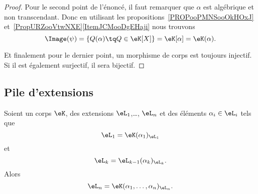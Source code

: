 \begin{proof}
    Pour le second point de l'énoncé, il faut remarquer que \( \alpha\) est algébrique et non transcendant. Donc en utilisant les propositions~\ref{PROPooPMNSooOkHOxJ} et~\ref{PropURZooVtwNXE}\ref{ItemJCMooDgEHaji} nous trouvons
    \begin{equation}
        \Image(\psi)=\{ Q(\alpha)\tq Q\in \eK[X] \}=\eK[\alpha]=\eK(\alpha).
    \end{equation}

    Et finalement pour le dernier point, un morphisme de corps est toujours injectif. Si il est également surjectif, il sera bijectif.
\end{proof}

\subsection{Pile d'extensions}

\begin{lemma}        \label{LEMooTURZooXnjmjT}
    Soient un corps \( \eK\), des extensions \( \eL_1\),\ldots, \( \eL_n\) et des éléments \( \alpha_i\in \eL_i\) tels que
    \begin{equation}    \label{EQooOCQSooFMkzTc}
        \eL_1=\eK(\alpha_1)_{\eL_1}
    \end{equation}
    et
    \begin{equation}
        \eL_k=\eL_{k-1}(\alpha_k)_{\eL_k}.
    \end{equation}
    Alors
    \begin{equation}
        \eL_n=\eK(\alpha_1,\ldots, \alpha_n)_{\eL_n}.
    \end{equation}
\end{lemma}

